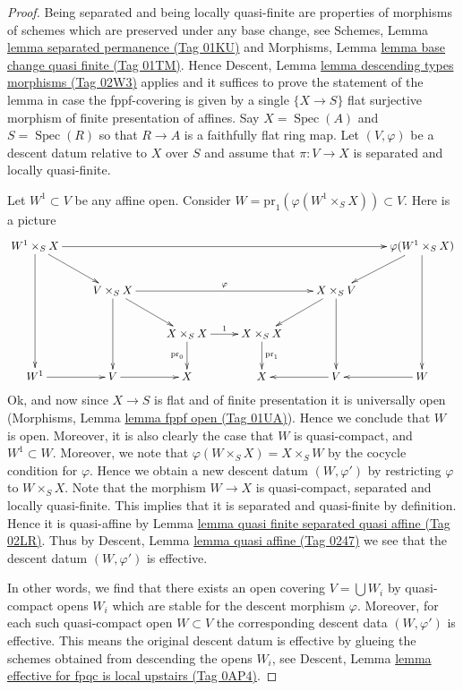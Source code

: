 \documentclass{amsart}
\theoremstyle{plain}
\theoremstyle{definition}
\theoremstyle{remark}
\numberwithin{equation}{subsection}
\def\Spec{\mathop{\mathrm{Spec}}}
\begin{document}
\begin{proof}
Being separated and being locally quasi-finite
are properties of morphisms of schemes
which are preserved under any base change, see
Schemes, Lemma \href{https://stacks.math.columbia.edu/tag/01KU}{lemma separated permanence (Tag 01KU)} and
Morphisms, Lemma \href{https://stacks.math.columbia.edu/tag/01TM}{lemma base change quasi finite (Tag 01TM)}.
Hence Descent, Lemma \href{https://stacks.math.columbia.edu/tag/02W3}{lemma descending types morphisms (Tag 02W3)}
applies and it suffices to prove the statement of the lemma
in case the fppf-covering is given by a single
$\{X \to S\}$ flat surjective morphism of finite presentation of affines.
Say $X = \Spec(A)$ and $S = \Spec(R)$ so
that $R \to A$ is a faithfully flat ring map.
Let $(V, \varphi)$ be a descent datum relative to $X$ over $S$
and assume that $\pi : V \to X$ is separated and
locally quasi-finite.

\medskip\noindent
Let $W^1 \subset V$ be any affine open.
Consider $W = \text{pr}_1(\varphi(W^1 \times_S X)) \subset V$.
Here is a picture
$$
\xymatrix{
W^1 \times_S X \ar[rrrrr] \ar[ddd] \ar[rd]
& & & & &
\varphi(W^1 \times_S X) \ar[ddd] \ar[ld] \\
& V \times_S X \ar[rrr]^\varphi \ar[rd] \ar[dd]
& & &
X \times_S V \ar[ld] \ar[dd] & \\
& &
X \times_S X \ar[r]^1 \ar[d]_{\text{pr}_0}
&
X \times_S X \ar[d]^{\text{pr}_1}
& & \\
W^1 \ar[r] &
V \ar[r] &
X &
X &
V \ar[l] &
W \ar[l]
}
$$
Ok, and now since $X \to S$ is flat and of finite presentation it
is universally open (Morphisms, Lemma \href{https://stacks.math.columbia.edu/tag/01UA}{lemma fppf open (Tag 01UA)}).
Hence we conclude that $W$ is open. Moreover, it is
also clearly the case that $W$ is quasi-compact, and
$W^1 \subset W$. Moreover, we note that
$\varphi(W \times_S X) = X \times_S W$ by the cocycle
condition for $\varphi$. Hence we obtain a new descent datum
$(W, \varphi')$ by restricting $\varphi$ to $W \times_S X$.
Note that the morphism $W \to X$ is quasi-compact, separated
and locally quasi-finite. This implies that it is
separated and quasi-finite by definition. Hence it is quasi-affine by
Lemma \href{https://stacks.math.columbia.edu/tag/02LR}{lemma quasi finite separated quasi affine (Tag 02LR)}.
Thus by
Descent, Lemma \href{https://stacks.math.columbia.edu/tag/0247}{lemma quasi affine (Tag 0247)}
we see that the descent datum
$(W, \varphi')$ is effective.

\medskip\noindent
In other words, we find that there exists an open covering
$V = \bigcup W_i$ by quasi-compact opens $W_i$ which are
stable for the descent morphism $\varphi$.
Moreover, for each such quasi-compact open $W \subset V$
the corresponding descent data $(W, \varphi')$ is effective.
This means the original descent datum is effective by glueing the
schemes obtained from descending the opens $W_i$, see
Descent, Lemma \href{https://stacks.math.columbia.edu/tag/0AP4}{lemma effective for fpqc is local upstairs (Tag 0AP4)}.
\end{proof}
\end{document}
